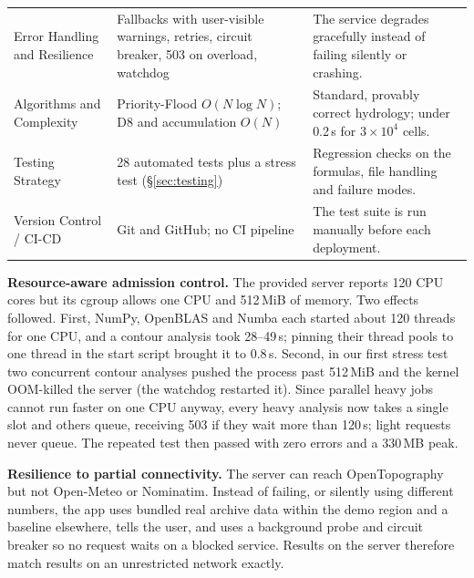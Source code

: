 \documentclass[manuscript,screen,review]{acmart}
\begin{document}
\begin{table}[t]
\begin{tabular}{p{2.8cm}p{5.2cm}p{6.5cm}}
    Error Handling and Resilience & Fallbacks with user-visible warnings, retries, circuit breaker, 503 on overload, watchdog & The service degrades gracefully instead of failing silently or crashing. \\
    Algorithms and Complexity & Priority-Flood $O(N\log N)$; D8 and accumulation $O(N)$ & Standard, provably correct hydrology; under 0.2\,s for $3\times10^4$ cells. \\
    Testing Strategy & 28 automated tests plus a stress test (\S\ref{sec:testing}) & Regression checks on the formulas, file handling and failure modes. \\
    Version Control / CI-CD & Git and GitHub; no CI pipeline & The test suite is run manually before each deployment. \\
    \bottomrule
  \end{tabular}
\end{table}

\textbf{Resource-aware admission control.} The provided server reports 120 CPU cores but its cgroup allows one CPU and 512\,MiB of memory. Two effects followed. First, NumPy, OpenBLAS and Numba each started about 120 threads for one CPU, and a contour analysis took 28--49\,s; pinning their thread pools to one thread in the start script brought it to 0.8\,s. Second, in our first stress test two concurrent contour analyses pushed the process past 512\,MiB and the kernel OOM-killed the server (the watchdog restarted it). Since parallel heavy jobs cannot run faster on one CPU anyway, every heavy analysis now takes a single slot and others queue, receiving 503 if they wait more than 120\,s; light requests never queue. The repeated test then passed with zero errors and a 330\,MB peak.

\textbf{Resilience to partial connectivity.} The server can reach OpenTopography but not Open-Meteo or Nominatim. Instead of failing, or silently using different numbers, the app uses bundled real archive data within the demo region and a baseline elsewhere, tells the user, and uses a background probe and circuit breaker so no request waits on a blocked service. Results on the server therefore match results on an unrestricted network exactly.

\end{document}
